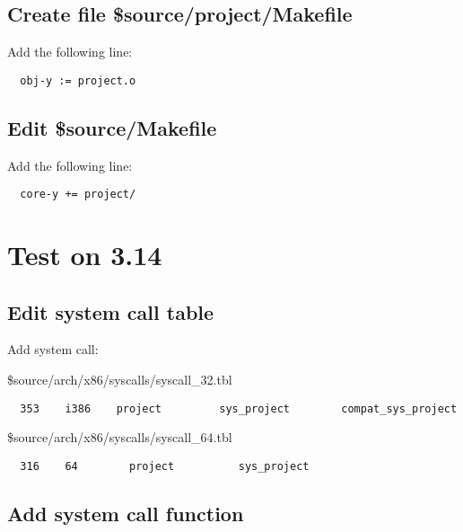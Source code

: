   \subsection{Create file \$source/project/Makefile}
  Add the following line:
  \begin{verbatim}
  obj-y := project.o
  \end{verbatim}
  
  \subsection{Edit \$source/Makefile}
  Add the following line:
  \begin{verbatim}
  core-y += project/
  \end{verbatim}
  
\section{Test on 3.14}
  
    \subsection{Edit system call table}
    
    Add system call:
    
	\$source/arch/x86/syscalls/syscall\_32.tbl
		\begin{verbatim}
  353    i386    project         sys_project        compat_sys_project
		\end{verbatim}
		
		 \$source/arch/x86/syscalls/syscall\_64.tbl
		  \begin{verbatim}
  316    64        project          sys_project
		\end{verbatim}
		
	\subsection{Add system call function}
	
